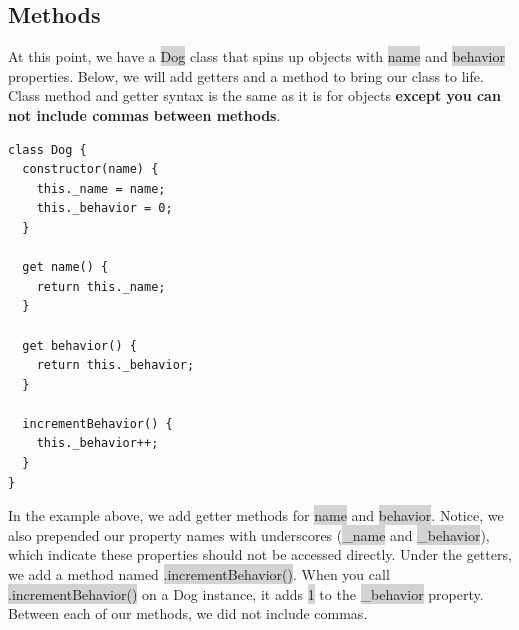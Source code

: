\documentclass[11pt]{article}
\begin{document}
\subsection{Methods}
At this point, we have a \colorbox{lightgray}{Dog} class that spins up objects with \colorbox{lightgray}{name} and \colorbox{lightgray}{behavior} properties. Below, we will add getters and a method to bring our class to life. Class method and getter syntax is the same as it is for objects \textbf{except you can not include commas between methods}. 
\begin{lstlisting}
class Dog {
  constructor(name) {
    this._name = name;
    this._behavior = 0;
  }

  get name() {
    return this._name;
  }

  get behavior() {
    return this._behavior;
  }

  incrementBehavior() {
    this._behavior++;
  }
}
\end{lstlisting}
In the example above, we add getter methods for \colorbox{lightgray}{name} and \colorbox{lightgray}{behavior}. Notice, we also prepended our property names with underscores (\colorbox{lightgray}{\_name} and \colorbox{lightgray}{\_behavior}), which indicate these properties should not be accessed directly. Under the getters, we add a method named \colorbox{lightgray}{.incrementBehavior()}. When you call \colorbox{lightgray}{.incrementBehavior()} on a Dog instance, it adds \colorbox{lightgray}{1} to the \colorbox{lightgray}{\_behavior} property. Between each of our methods, we did not include commas.
\end{document}
